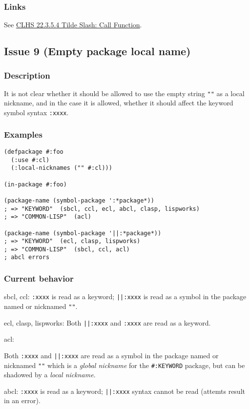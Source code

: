 \documentclass[11pt]{article}
\begin{document}
\subsubsection{Links}
\label{sec:orgc279427}
See \href{https://www.lispworks.com/documentation/HyperSpec/Body/22\_ced.htm}{CLHS 22.3.5.4 Tilde Slash: Call Function}.
\subsection{Issue 9 (Empty package local name)}
\label{sec:orgd5e9d80}
\subsubsection{Description}
\label{sec:org2c3cc6f}
It is not clear whether it should be allowed to use the empty string \texttt{""} as a
local nickname, and in the case it is allowed, whether it should affect the
keyword symbol syntax \texttt{:xxxx}.
\subsubsection{Examples}
\label{sec:orgde188ff}
\begin{verbatim}
(defpackage #:foo
  (:use #:cl)
  (:local-nicknames ("" #:cl)))

(in-package #:foo)

(package-name (symbol-package ':*package*))
; => "KEYWORD"  (sbcl, ccl, ecl, abcl, clasp, lispworks)
; => "COMMON-LISP"  (acl)

(package-name (symbol-package '||:*package*))
; => "KEYWORD"  (ecl, clasp, lispworks)
; => "COMMON-LISP"  (sbcl, ccl, acl)
; abcl errors
\end{verbatim}
\subsubsection{Current behavior}
\label{sec:org13c533a}
sbcl, ccl:
\texttt{:xxxx} is read as a keyword;
\texttt{||:xxxx} is read as a symbol in the package named or nicknamed \texttt{""}.

ecl, clasp, lispworks:
Both \texttt{||:xxxx} and \texttt{:xxxx} are read as a keyword.

acl:

Both \texttt{:xxxx} and \texttt{||:xxxx} are read as a symbol in the package named or nicknamed
\texttt{""} which is a \emph{global nickname} for the \texttt{\#:KEYWORD} package, but can be shadowed
by a \emph{local nickname}.

abcl:
\texttt{:xxxx} is read as a keyword;
\texttt{||:xxxx} syntax cannot be read (attemts result in an error).
\end{document}
